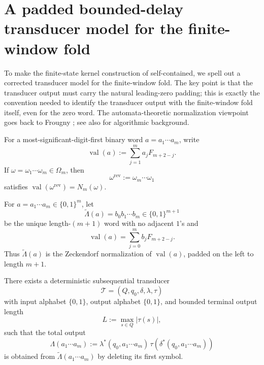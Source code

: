 \section{A padded bounded-delay transducer model for the finite-window fold}
\label{app:transducer}

To make the finite-state kernel construction of
 self-contained, we spell
out a corrected transducer model for the finite-window fold.  The key point is
that the transducer output must carry the natural leading-zero padding; this is
exactly the convention needed to identify the transducer output with the
finite-window fold itself, even for the zero word.  The automata-theoretic
normalization viewpoint goes back to Frougny
\cite{Frougny1991FibonacciAutomata,Frougny1992NumbersAutomata}; see also
\cite{AhlbachUsatineFrougnyPippenger2013} for algorithmic background.

For a most-significant-digit-first binary word \(a=a_1\cdots a_m\), write
\[
  \operatorname{val}(a):=\sum_{j=1}^m a_jF_{m+2-j}.
\]
If \(\omega=\omega_1\cdots\omega_m\in\Omega_m\), then
\[
  \omega^{\mathrm{rev}}:=\omega_m\cdots\omega_1
\]
satisfies \(\operatorname{val}(\omega^{\mathrm{rev}})=N_m(\omega)\).

\begin{definition}
\label{def:appendix-padded-normalization}
For \(a=a_1\cdots a_m\in\{0,1\}^m\), let
\[
  \widetilde\Lambda(a)=b_0b_1\cdots b_m\in\{0,1\}^{m+1}
\]
be the unique length-\((m+1)\) word with no adjacent \(1\)'s and
\[
  \operatorname{val}(a)
  =
  \sum_{j=0}^{m} b_jF_{m+2-j}.
\]
Thus \(\widetilde\Lambda(a)\) is the Zeckendorf normalization of
\(\operatorname{val}(a)\), padded on the left to length \(m+1\).
\end{definition}

\begin{proposition}
\label{prop:appendix-padded-transducer}
There exists a deterministic subsequential transducer
\[
  \mathcal T=(Q,q_0,\delta,\lambda,\tau)
\]
with input alphabet \(\{0,1\}\), output alphabet \(\{0,1\}\), and bounded
terminal output length
\[
  L:=\max_{s\in Q}|\tau(s)|,
\]
such that the total output
\[
  \Lambda(a_1\cdots a_m)
  :=
  \lambda^*(q_0,a_1\cdots a_m)\,
  \tau(\delta^*(q_0,a_1\cdots a_m))
\]
is obtained from \(\widetilde\Lambda(a_1\cdots a_m)\) by deleting its first
symbol.
\end{proposition}


